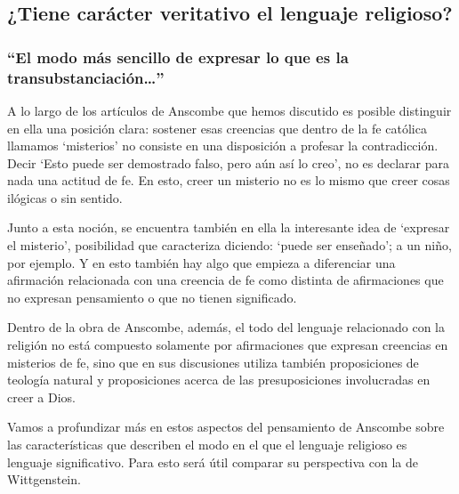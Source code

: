 \subsection{¿Tiene carácter veritativo el lenguaje religioso?}

\subsubsection{\enquote{El modo más sencillo de expresar lo que es la transubstanciación\ldots}}

A lo largo de los artículos de Anscombe que hemos discutido es posible distinguir en ella una posición clara: sostener esas creencias que dentro de la fe católica llamamos `misterios' no consiste en una disposición a profesar la contradicción. Decir \enquote*{Esto puede ser demostrado falso, pero aún así lo creo}, no es declarar para nada una actitud de fe. En esto, creer un misterio no es lo mismo que creer cosas ilógicas o sin sentido.

Junto a esta noción, se encuentra también en ella la interesante idea de \enquote*{expresar el misterio}, posibilidad que caracteriza diciendo: \enquote*{puede ser enseñado}; a un niño, por ejemplo. Y en esto también hay algo que empieza a diferenciar una afirmación relacionada con una creencia de fe como distinta de afirmaciones que no expresan pensamiento o que no tienen significado.

Dentro de la obra de Anscombe, además, el todo del lenguaje relacionado con la religión no está compuesto solamente por afirmaciones que expresan creencias en misterios de fe, sino que en sus discusiones utiliza también proposiciones de teología natural y proposiciones acerca de las presuposiciones involucradas en creer a Dios.

Vamos a profundizar más en estos aspectos del pensamiento de Anscombe sobre las características que describen el modo en el que el lenguaje religioso es lenguaje significativo. Para esto será útil comparar su perspectiva con la de Wittgenstein.

